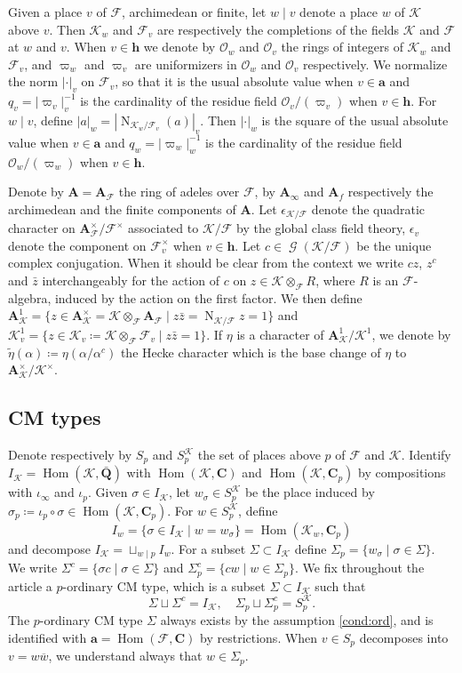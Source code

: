\documentclass[leqno]{amsart}
\theoremstyle{definition}
\theoremstyle{remark}
\newcommand{\oo}{\mathcal{O}}
\newcommand{\Q}{{\mathbf{Q}}}
\newcommand{\C}{\mathbf C}
\newcommand{\A}{\mathbf A}
\newcommand{\arch}{\mathbf{a}}
\newcommand{\finite}{\mathbf{h}}
\DeclareMathOperator{\Nr}{N}
\DeclareMathOperator{\Hom}{Hom}
\DeclareMathOperator{\Gal}{\mathcal{G}}
\newcommand{\F}{{\mathcal{F}}} %
\newcommand{\K}{{\mathcal{K}}} %
\newcommand{\qch}{\epsilon} %
\newcommand{\bw}{{\overline{w}}}
\begin{document}
Given a place $v$ of $\F$, archimedean or finite,
let $w\mid v$ denote a place $w$ of $\K$ above $v$.
Then $\K_w$ and $\F_v$ are respectively
the completions of the fields $\K$ and $\F$ at $w$ and $v$.
When $v\in \finite$ we denote by $\oo_w$ and $\oo_v$ 
the rings of integers of $\K_w$ and $\F_v$, and
$\varpi_w$ and $\varpi_v$
are uniformizers in $\oo_w$ and $\oo_v$ respectively.
We normalize the norm $|\cdot|_v$ on $\F_v$,
so that it is the usual absolute value when $v\in \arch$
and $q_v=|\varpi_v|_v^{-1}$
is the cardinality of the residue field $\oo_v/(\varpi_v)$
when $v\in \finite$.
For $w\mid v$, define $|a|_w=|\Nr_{\K_w/\F_v}(a)|_v$.
Then $|\cdot|_w$ is the square of the usual absolute value
when $v\in\arch$ and
$q_w=|\varpi_w|_w^{-1}$
is the cardinality of the residue field $\oo_w/(\varpi_w)$
when $v\in\finite$.

Denote by $\A=\A_{\F}$ the ring of adeles over $\F$,
by $\A_{\infty}$ and $\A_{f}$ respectively
the archimedean and the finite components of $\A$.
Let $\qch_{\K/\F}$ denote 
the quadratic character on $\A_\F^\times/\F^\times$
associated to $\K/\F$ by the global class field theory,
$\qch_v$ denote the component on $\F_v^\times$ 
when $v\in \finite$.
Let $c\in \Gal(\K/\F)$ be the unique complex conjugation.
When it should be clear from the context
we write $cz$, $z^c$ and $\bar{z}$ interchangeably 
for the action of $c$ on $z\in \K\otimes_\F R$, where $R$ is an $\F$-algebra,
induced by the action on the first factor.
We then define 
$\A_\K^1=\{z\in \A^\times_\K=\K\otimes_\F \A_\F \mid z\bar{z}=\Nr_{\K/\F}z=1\}$ and
$\K_v^1=\{z\in \K_v\coloneqq \K\otimes_\F\F_v\mid z\bar{z}=1\}$.
If $\eta$ is a character of $\A_\K^1/\K^1$, 
we denote
by $\tilde{\eta}(\alpha)\coloneqq \eta(\alpha/\alpha^c)$
the Hecke character which is the base change of $\eta$ 
to $\A_\K^\times/\K^\times$.

\subsection{CM types}

Denote respectively by $S_p$ and $S_p^\K$ the set of places above $p$
of $\F$ and $\K$.
Identify $I_\K=\Hom(\K,\bar{\Q})$ with
$\Hom(\K,\C)$ and $\Hom(\K,\C_p)$ by compositions with $\iota_\infty$ and $\iota_p$.
Given $\sigma\in I_\K$,
let $w_\sigma\in S_p^\K$ be the place induced by
$\sigma_p\coloneqq \iota_p\circ \sigma\in\Hom(\K,\C_p)$.
For $w\in S_p^\K$, define
\[
    I_w=\{\sigma\in I_\K\mid w=w_\sigma \}=\Hom(\K_w,\C_p)
\]
and decompose $I_\K=\sqcup_{w\mid p}I_w$.
For a subset $\Sigma\subset I_\K$
define $\Sigma_p=\{w_\sigma\mid \sigma\in \Sigma\}$.
We write
$\Sigma^c=\{\sigma c\mid \sigma\in \Sigma\}$ and 
$\Sigma_p^c=\{cw\mid w\in \Sigma_p\}$.
We fix throughout the article a $p$-ordinary CM type,
which is a subset $\Sigma\subset I_\K$ such that
\[
    \Sigma\sqcup \Sigma^c=I_\K,\quad
    \Sigma_p\sqcup \Sigma_p^c=S_p^\K.
\]
The $p$-ordinary CM type $\Sigma$
always exists by the assumption \eqref{cond:ord},
and is identified with $\arch=\Hom(\F,\C)$ by restrictions.
When $v\in S_p$ decomposes into $v=w\bw$,
we understand always that $w\in \Sigma_p$.
\end{document}
